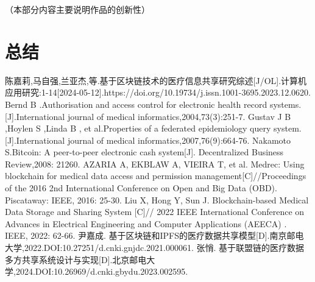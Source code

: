 \documentclass{cumcmthesis}
\numberwithin{equation}{section} %
\numberwithin{figure}{section} %
\numberwithin{table}{section} %
\begin{document}
（本部分内容主要说明作品的创新性）

\newpage

\section{总结}

\newpage

\begin{thebibliography}{9}%
	\setlength{\itemsep}{-1mm}  %
	
	陈嘉莉,马自强,兰亚杰,等.基于区块链技术的医疗信息共享研究综述[J/OL].计算机应用研究:1-14[2024-05-12].https://doi.org/10.19734/j.issn.1001-3695.2023.12.0620.
	Bernd B .Authorisation and access control for electronic health record systems.[J].International journal of medical informatics,2004,73(3):251-7.
	Gustav J B ,Hoylen S ,Linda B , et al.Properties of a federated epidemiology query system.[J].International journal of medical informatics,2007,76(9):664-76.
	Nakamoto S.Bitcoin: A peer-to-peer electronic cash system[J]. Decentralized Business Review,2008: 21260.
	AZARIA A, EKBLAW A, VIEIRA T, et al. Medrec: Using blockchain for medical data access and permission management[C]//Proceedings of the 2016 2nd International Conference on Open and Big Data (OBD). Piscataway: IEEE, 2016: 25-30.
	Liu X, Hong Y, Sun J. Blockchain-based Medical Data Storage and Sharing System [C]// 2022 IEEE International Conference on Advances in Electrical Engineering and Computer Applications (AEECA) . IEEE, 2022: 62-66.
	尹嘉成. 基于区块链和IPFS的医疗数据共享模型[D].南京邮电大学,2022.DOI:10.27251/d.cnki.gnjdc.2021.000061.
	张悄. 基于联盟链的医疗数据多方共享系统设计与实现[D].北京邮电大学,2024.DOI:10.26969/d.cnki.gbydu.2023.002595.

\end{thebibliography}
\end{document}
